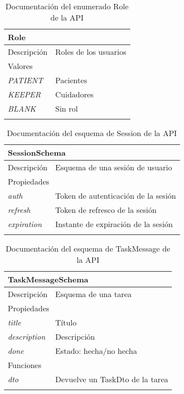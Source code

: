 \newpage
\begin{longtable}{|p{} p{}|}
    \hline
    \multicolumn{2}{|l|}{\textbf{Role}} \\ \hline \hline
    Descripción      & Roles de los usuarios \\ \hline
    \multicolumn{2}{|l|}{Valores} \\
    \emph{PATIENT}  & Pacientes  \\
    \emph{KEEPER}  & Cuidadores  \\
    \emph{BLANK}  & Sin rol  \\ \hline
    \caption{Documentación del enumerado Role de la API}
    \label{dis:api:role}
\end{longtable}

\begin{longtable}{|p{} p{}|}
    \hline
    \multicolumn{2}{|l|}{\textbf{SessionSchema}} \\ \hline \hline
    Descripción      & Esquema de una sesión de usuario \\ \hline
    \multicolumn{2}{|l|}{Propiedades} \\
    \emph{auth}  & Token de autenticación de la sesión  \\
    \emph{refresh}  & Token de refresco de la sesión  \\
    \emph{expiration}  & Instante de expiración de la sesión  \\ \hline
    \caption{Documentación del esquema de Session de la API}
    \label{dis:api:session}
\end{longtable}

\begin{longtable}{|p{} p{}|}
    \hline
    \multicolumn{2}{|l|}{\textbf{TaskMessageSchema}} \\ \hline \hline
    Descripción      & Esquema de una tarea \\ \hline
    \multicolumn{2}{|l|}{Propiedades} \\
    \emph{title}  & Título  \\
    \emph{description}  & Descripción  \\
    \emph{done}  & Estado: hecha/no hecha  \\ \hline
    \multicolumn{2}{|l|}{Funciones} \\
    \emph{dto}  & Devuelve un TaskDto de la tarea  \\ \hline
    \caption{Documentación del esquema de TaskMessage de la API}
    \label{dis:api:task_message}
\end{longtable}


